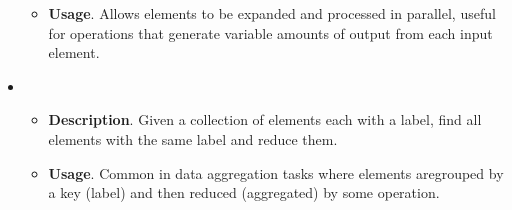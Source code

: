 \begin{itemize}
\begin{itemize}
        \item[\textcolor{Green3}{\faIcon{question}}] \textcolor{Green3}{\textbf{Usage}}. Allows elements to be expanded and processed in parallel, useful for operations that generate variable amounts of output from each input element.
    \end{itemize}


    \item {}
    \begin{itemize}
        \item[\textcolor{Red2}{\faIcon{book}}] \textcolor{Red2}{\textbf{Description}}. Given a collection of elements each with a label, find all elements with the same label and reduce them.

        \item[\textcolor{Green3}{\faIcon{question}}] \textcolor{Green3}{\textbf{Usage}}. Common in data aggregation tasks where elements are\break grouped by a key (label) and then reduced (aggregated) by some operation.
    \end{itemize}
\end{itemize}
